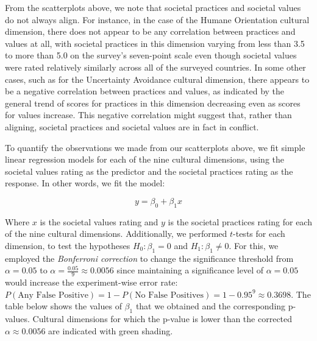 \documentclass[
]{article}
\begin{document}
From the scatterplots above, we note that societal practices and
societal values do not always align. For instance, in the case of the
Humane Orientation cultural dimension, there does not appear to be any
correlation between practices and values at all, with societal practices
in this dimension varying from less than 3.5 to more than 5.0 on the
survey's seven-point scale even though societal values were rated
relatively similarly across all of the surveyed countries. In some other
cases, such as for the Uncertainty Avoidance cultural dimension, there
appears to be a negative correlation between practices and values, as
indicated by the general trend of scores for practices in this dimension
decreasing even as scores for values increase. This negative correlation
might suggest that, rather than aligning, societal practices and
societal values are in fact in conflict.

To quantify the observations we made from our scatterplots above, we fit
simple linear regression models for each of the nine cultural
dimensions, using the societal values rating as the predictor and the
societal practices rating as the response. In other words, we fit the
model:

\[
y = \beta_0 + \beta_1 x
\]

Where \(x\) is the societal values rating and \(y\) is the societal
practices rating for each of the nine cultural dimensions. Additionally,
we performed \(t\)-tests for each dimension, to test the hypotheses
\(H_0: \beta_1 = 0\) and \(H_1: \beta_1 \ne 0\). For this, we employed
the \emph{Bonferroni correction} to change the significance threshold
from \(\alpha = 0.05\) to \(\alpha = \frac{0.05}{9} \approx 0.0056\)
since maintaining a significance level of \(\alpha = 0.05\) would
increase the experiment-wise error rate:
\(P(\text{Any False Positive}) = 1 - P(\text{No False Positives}) = 1 - 0.95^{9} \approx 0.3698\).
The table below shows the values of \(\beta_1\) that we obtained and the
corresponding p-values. Cultural dimensions for which the p-value is
lower than the corrected \(\alpha \approx 0.0056\) are indicated with
green shading.
\end{document}
